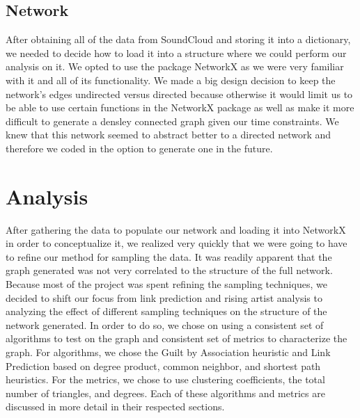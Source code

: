 \documentclass{article}
\begin{document}
\subsection{Network}

After obtaining all of the data from SoundCloud and storing it into a dictionary, we needed to decide how to load it into a structure where we could perform our analysis on it. We opted to use the package NetworkX as we were very familiar with it and all of its functionality.  We made a big design decision to keep the network's edges undirected versus directed because otherwise it would limit us to be able to use certain functions in the NetworkX package as well as make it more difficult to generate a densley connected graph given our time constraints.  We knew that this network seemed to abstract better to a directed network and therefore we coded in the option to generate one in the future.

\section{Analysis}

After gathering the data to populate our network and loading it into NetworkX in order to conceptualize it, we realized very quickly that we were going to have to refine our method for sampling the data.  It was readily apparent that the graph generated was not very correlated to the structure of the full network.  Because most of the project was spent refining the sampling techniques, we decided to shift our focus from link prediction and rising artist analysis to analyzing the effect of different sampling techniques on the structure of the network generated.  In order to do so, we chose on using a consistent set of algorithms to test on the graph and consistent set of metrics to characterize the graph.  For algorithms, we chose the Guilt by Association heuristic and Link Prediction based on degree product, common neighbor, and shortest path heuristics.  For the metrics, we chose to use clustering coefficients, the total number of triangles, and degrees.  Each of these algorithms and metrics are discussed in more detail in their respected sections.
\end{document}
